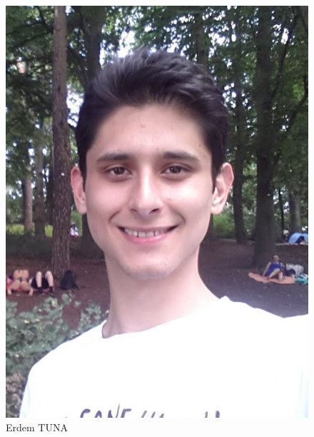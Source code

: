 \documentclass[a4paper,12pt]{article}
\begin{document}
\begin{minipage}{0.33\textwidth}
\begin{flushleft} 

\begin{figure}[H]
	\center
	\setlength{\unitlength}{\textwidth} 
	\includegraphics[width=0.8\unitlength]{images/erdem_foto}
	\caption{\label{fig:erdem_foto} \small Erdem TUNA }
\end{figure}

\end{flushleft}
\end{minipage}
\end{document}
